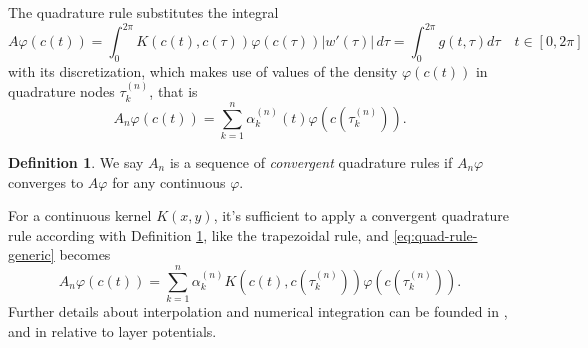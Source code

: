 \documentclass[10pt, a4paper, twoside, openright]{book}
\theoremstyle{definition}
\newtheorem{definition}[subsection]{Definition}
\theoremstyle{plain}
\theoremstyle{plain}
\theoremstyle{plain}
\theoremstyle{plain}
\theoremstyle{plain}
\theoremstyle{plain}
\theoremstyle{plain}
\theoremstyle{plain}
\let\phi\varphi
\begin{document}
The quadrature rule substitutes the integral
\begin{equation}
 A\phi(c(t))=\int_0^{2\pi} K(c(t),c(\tau))\phi(c(\tau))|w'(\tau)|\,d\tau=\int_0^{2\pi}g(t,\tau)d\tau \quad t\in[0,2\pi]
\end{equation}
with its discretization, which makes use of values of the density $\phi(c(t))$ in quadrature 
nodes $\tau_k^{(n)}$, that is
\begin{equation}
\label{eq:quad-rule-generic}
 A_n\phi(c(t)) = \sum_{k=1}^n\alpha_k^{(n)}(t)\phi(c(\tau_k^{(n)})).
\end{equation}
\begin{definition}
\label{def:convergent-quadrature-rule}
We say $A_n$ is a sequence of \emph{convergent} quadrature rules if $A_n\phi$ converges to $A\phi$ for any continuous $\phi$.
\end{definition}
For a continuous kernel $K(x,y)$, it's sufficient to apply a convergent quadrature rule according with Definition 
\ref{def:convergent-quadrature-rule}, like the trapezoidal rule, 
and \eqref{eq:quad-rule-generic} becomes
\begin{equation}
\label{eq:quad-rule-continuous}
 A_n\phi(c(t)) = \sum_{k=1}^n\alpha_k^{(n)}K(c(t),c(\tau_k^{(n)}))\phi(c(\tau_k^{(n)})).
\end{equation}
Further details about interpolation and numerical integration can be founded in \cite{QSS:book}, and in 
\cite{kress:book} relative to layer potentials.
\end{document}
